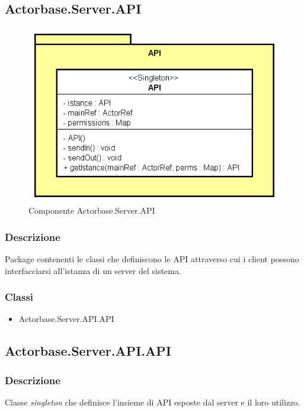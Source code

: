 \documentclass[a4paper]{article}
\begin{document}
		\subsection{Actorbase.Server.API}
			\begin{figure} [H]
			\centering
			\includegraphics[scale=0.70]{Server/Package/APILevel.png}
			\caption{Componente Actorbase.Server.API}
			\end{figure}
			\subsubsection{Descrizione}
				Package contenenti le classi che definiscono le API attraverso cui i client possono interfacciarsi all'istanza di un server del sistema.
			\subsubsection{Classi}
			\begin{itemize}
				\item Actorbase.Server.API.API
			\end{itemize}
			
			\subsection{Actorbase.Server.API.API}
			\subsubsection{Descrizione}
				Classe \emph{singleton} che definisce l'insieme di API esposte dal server e il loro utilizzo.
\end{document}
